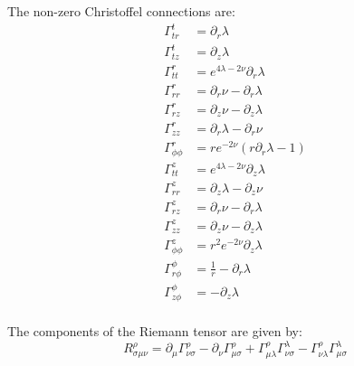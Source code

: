 \documentclass{article}
\begin{document}
The non-zero Christoffel connections are:
\begin{equation}
\begin{aligned}
\Gamma^{t}_{tr}&=\partial_{r}\lambda\\
\Gamma^{t}_{tz}&=\partial_{z}\lambda\\
\Gamma^{r}_{tt}&=e^{4\lambda-2\nu}\partial_{r}\lambda\\
\Gamma^{r}_{rr}&=\partial_{r}\nu-\partial_{r}\lambda\\
\Gamma^{r}_{rz}&=\partial_{z}\nu-\partial_{z}\lambda\\
\Gamma^{r}_{zz}&=\partial_{r}\lambda-\partial_{r}\nu\\
\Gamma^{r}_{\phi\phi}&=re^{-2\nu}\left(r\partial_{r}\lambda-1\right)\\
\Gamma^{z}_{tt}&=e^{4\lambda-2\nu}\partial_{z}\lambda\\
\Gamma^{z}_{rr}&=\partial_{z}\lambda-\partial_{z}\nu\\
\Gamma^{z}_{rz}&=\partial_{r}\nu-\partial_{r}\lambda\\ 
\Gamma^{z}_{zz}&=\partial_{z}\nu-\partial_{z}\lambda\\
\Gamma^{z}_{\phi\phi}&=r^{2}e^{-2\nu}\partial_{z}\lambda\\
\Gamma^{\phi}_{r\phi}&=\frac{1}{r}-\partial_{r}\lambda\\
\Gamma^{\phi}_{z\phi}&=-\partial_{z}\lambda\\
\end{aligned}
\label{eq:christoffel-connections}
\end{equation}

The components of the Riemann tensor are given by:
\begin{equation}
R_{\sigma\mu\nu}^{\rho}=\partial_{\mu}\Gamma_{\nu\sigma}^{\rho}-\partial_{\nu}\Gamma_{\mu\sigma}^{\rho}+\Gamma_{\mu\lambda}^{\rho}\Gamma_{\nu\sigma}^{\lambda}-\Gamma_{\nu\lambda}^{\rho}\Gamma_{\mu\sigma}^{\lambda}
\end{equation}
\end{document}
